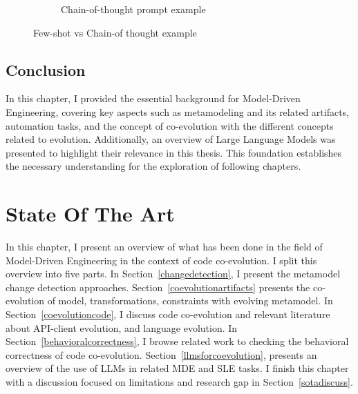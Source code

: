\begin{itemize}
\begin{figure}[t!]
\begin{subfigure}[t]{0.5\linewidth}
			\caption{Chain-of-thought prompt example}
			\label{fig:cotexample}
		\end{subfigure}
		\caption{ Few-shot vs Chain-of thought example }
	\end{figure}
	
	
	
\end{itemize}
\section{Conclusion}
In this chapter, I provided the essential background for Model-Driven Engineering, covering key aspects such as metamodeling and its related artifacts, automation tasks, and the concept of co-evolution with the different concepts related to evolution. Additionally, an overview of Large Language Models was presented to highlight their relevance in this thesis. This foundation establishes the necessary understanding for the exploration of following chapters.

\chapter{State Of The Art}
\label{sota}
In this chapter, I present an overview of what has been done in the field of Model-Driven Engineering in the context of code co-evolution. I split this overview into five parts. In Section~\ref{changedetection}, I present the metamodel change detection approaches. Section~\ref{coevolutionartifacts} presents the co-evolution of model, transformations, constraints with evolving metamodel. In Section~\ref{coevolutioncode}, I discuss code co-evolution and relevant literature about API-client evolution, and language evolution. In Section~\ref{behavioralcorrectness}, I browse related work to checking the behavioral correctness of code co-evolution. Section~\ref{llmsforcoevolution}, presents an overview of the use of LLMs in related MDE and SLE tasks. I finish this chapter with a discussion focused on limitations and research gap in Section~\ref{sotadiscuss}.

